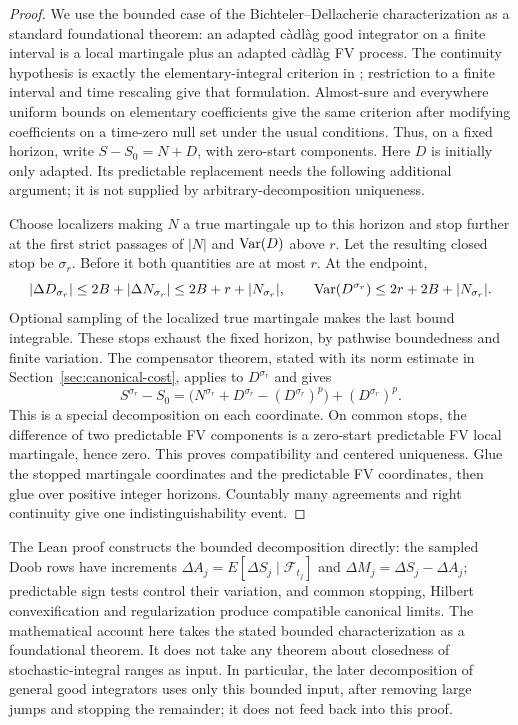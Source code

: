 \begin{proof}
We use the bounded case of the Bichteler--Dellacherie characterization as a
standard foundational theorem: an adapted c\`adl\`ag good integrator on a
finite interval is a local martingale plus an adapted c\`adl\`ag FV process.
The continuity hypothesis is exactly the elementary-integral criterion in
\cite[Definition 1.1 and Theorem 1.2]{BSV}; restriction to a finite interval
and time rescaling give that formulation. Almost-sure and everywhere uniform
bounds on elementary coefficients give the same criterion after modifying
coefficients on a time-zero null set under the usual conditions.
Thus, on a fixed horizon, write $S-S_0=N+D$, with zero-start components.
Here $D$ is initially only adapted. Its predictable replacement needs the
following additional argument; it is not supplied by arbitrary-decomposition
uniqueness.

Choose localizers making $N$ a true martingale up to this horizon and stop
further at the first strict passages of $|N|$ and $\operatorname{Var}(D)$ above $r$.
Let the resulting closed stop be $\sigma_r$. Before it both quantities are
at most $r$. At the endpoint,
\[
 |\Delta D_{\sigma_r}|
 \leq2B+|\Delta N_{\sigma_r}|
 \leq2B+r+|N_{\sigma_r}|,
 \qquad
 \operatorname{Var}(D^{\sigma_r})\leq2r+2B+|N_{\sigma_r}|.
\]
Optional sampling of the localized true martingale makes the last bound
integrable. These stops exhaust the fixed horizon, by pathwise boundedness
and finite variation. The compensator theorem, stated with its norm estimate
in Section~\ref{sec:canonical-cost}, applies to $D^{\sigma_r}$ and gives
\[
 S^{\sigma_r}-S_0
 =\bigl(N^{\sigma_r}+D^{\sigma_r}-(D^{\sigma_r})^p\bigr)
   +(D^{\sigma_r})^p.
\]
This is a special decomposition on each coordinate. On common stops, the
difference of two predictable FV components is a zero-start predictable
FV local martingale, hence zero. This proves compatibility and centered
uniqueness. Glue the stopped martingale coordinates and the predictable FV
coordinates, then glue over positive integer horizons. Countably many
agreements and right continuity give one indistinguishability event.
\end{proof}

The Lean proof constructs the bounded decomposition directly: the sampled
Doob rows have increments
$\Delta A_j=E[\Delta S_j\mid\mathcal F_{t_j}]$ and
$\Delta M_j=\Delta S_j-\Delta A_j$; predictable sign tests control their
variation, and common stopping, Hilbert convexification and regularization
produce compatible canonical limits. The mathematical account here takes
the stated bounded characterization as a foundational theorem. It does not
take any theorem about closedness of stochastic-integral ranges as input.
In particular, the later decomposition of general good integrators uses only
this bounded input, after removing large jumps and stopping the remainder;
it does not feed back into this proof.
